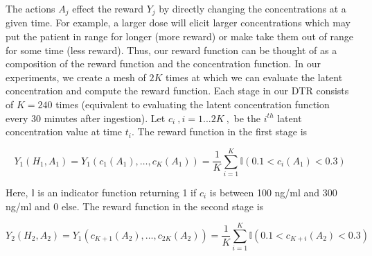 The actions $A_j$ effect the reward $Y_j$ by directly changing the concentrations at a given time.  For example, a larger dose will elicit larger concentrations which may put the patient in range for longer (more reward) or make take them out of range for some time (less reward).  Thus, our reward function can be thought of as a composition of the reward function and the concentration function.  In our experiments, we create a mesh of $2K$ times at which we can evaluate the latent concentration and compute the reward function.  Each stage in our DTR consists of $K=240$ times (equivalent to evaluating the latent concentration function every 30 minutes after ingestion).  Let $ c_i \>,  i=1...2K \>, $ be the $ i^{th}$ latent concentration value at time $ t_i $.  The reward function in the first stage is

\begin{equation}
Y_1(H_1, A_1) = Y_1(c_1(A_1), \dots, c_K(A_1)) = \dfrac{1}{K}\sum_{i=1}^K \mathbb{I}(0.1 < c_i(A_1) < 0.3)
\end{equation}



\noindent Here, $ \mathbb{I} $ is an indicator function returning 1 if $c_i$ is between 100 ng/ml and 300 ng/ml and 0 else.
%
\noindent The reward function in the second stage is

\begin{equation}
Y_2(H_2, A_2) = Y_1(c_{K+1}(A_2), \dots, c_{2K}(A_2)) = \dfrac{1}{K}\sum_{i=1}^K \mathbb{I}(0.1 < c_{K+i}(A_2) < 0.3)
\end{equation}



